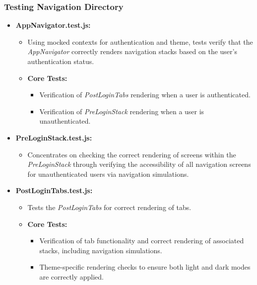 \subsubsection{Testing Navigation Directory}

\begin{itemize}
    \item \textbf{AppNavigator.test.js:}
    \begin{itemize}
        \item Using mocked contexts for authentication and theme, tests verify that the \textit{AppNavigator} correctly renders navigation stacks based on the user's authentication status.
        \item \textbf{Core Tests:}
        \begin{itemize}
            \item Verification of \textit{PostLoginTabs} rendering when a user is authenticated.
            \item Verification of \textit{PreLoginStack} rendering when a user is unauthenticated.
        \end{itemize}
    \end{itemize}

    \item \textbf{PreLoginStack.test.js:}
    \begin{itemize}
        \item Concentrates on checking the correct rendering of screens within the \textit{PreLoginStack} through verifying the accessibility of all navigation screens for unauthenticated users via navigation simulations.
    \end{itemize}

    \item \textbf{PostLoginTabs.test.js:}
    \begin{itemize}
        \item Tests the \textit{PostLoginTabs} for correct rendering of tabs.
        \item \textbf{Core Tests:}
        \begin{itemize}
            \item Verification of tab functionality and correct rendering of associated stacks, including navigation simulations.
            \item Theme-specific rendering checks to ensure both light and dark modes are correctly applied.
        \end{itemize}
    \end{itemize}
    

\end{itemize}
